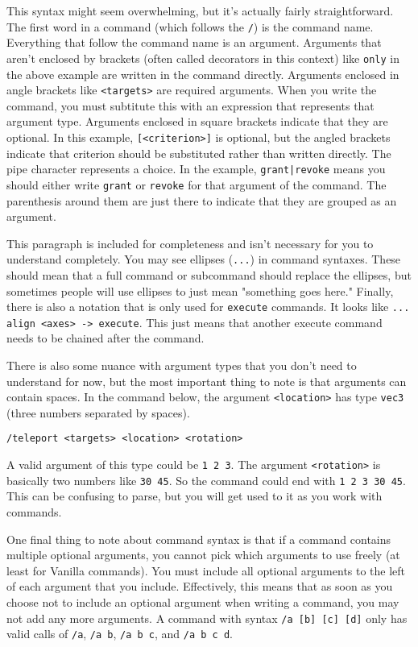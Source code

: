 \documentclass[oneside]{book}
\begin{document}
This syntax might seem overwhelming, but it's actually fairly straightforward. The first word in a command (which follows the \texttt{/}) is the command name. Everything that follow the command name is an argument. Arguments that aren't enclosed by brackets (often called decorators in this context) like \texttt{only} in the above example are written in the command directly. Arguments enclosed in angle brackets like \texttt{<targets>} are required arguments. When you write the command, you must subtitute this with an expression that represents that argument type. Arguments enclosed in square brackets indicate that they are optional. In this example, \texttt{[<criterion>]} is optional, but the angled brackets indicate that criterion should be substituted rather than written directly. The pipe character represents a choice. In the example, \texttt{grant|revoke} means you should either write \texttt{grant} or \texttt{revoke} for that argument of the command. The parenthesis around them are just there to indicate that they are grouped as an argument. 

This paragraph is included for completeness and isn't necessary for you to understand completely. You may see ellipses (\texttt{...}) in command syntaxes. These should mean that a full command or subcommand should replace the ellipses, but sometimes people will use ellipses to just mean "something goes here." Finally, there is also a notation that is only used for \texttt{execute} commands. It looks like \texttt{... align <axes> -> execute}. This just means that another execute command needs to be chained after the command.

There is also some nuance with argument types that you don't need to understand for now, but the most important thing to note is that arguments can contain spaces. In the command below, the argument \texttt{<location>} has type \texttt{vec3} (three numbers separated by spaces).

\begin{verbatim}
/teleport <targets> <location> <rotation>
\end{verbatim}

A valid argument of this type could be \texttt{1 2 3}. The argument \texttt{<rotation>} is basically two numbers like \texttt{30 45}. So the command could end with \texttt{1 2 3 30 45}. This can be confusing to parse, but you will get used to it as you work with commands.

One final thing to note about command syntax is that if a command contains multiple optional arguments, you cannot pick which arguments to use freely (at least for Vanilla commands). You must include all optional arguments to the left of each argument that you include. Effectively, this means that as soon as you choose not to include an optional argument when writing a command, you may not add any more arguments. A command with syntax \texttt{/a [b] [c] [d]} only has valid calls of \texttt{/a}, \texttt{/a b}, \mbox{\texttt{/a b c}}, and \texttt{/a b c d}.
\end{document}
